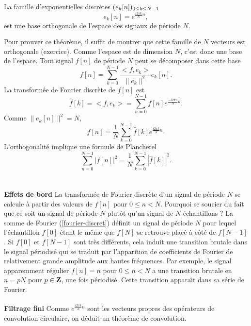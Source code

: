 \begin{theorem}
La famille d'exponentielles discr\`etes
$(e_k[n])_{ 0 \leq k \leq N-1}$
\begin{equation}
e_k[n] = e^{ \frac {i2 \pi k} N n  },
\end{equation}
est une base orthogonale de l'espace des signaux
de p\'eriode $N$.
\end{theorem}

Pour prouver ce th\'eor\`eme, il suffit de montrer que
cette famille de $N$ vecteurs est orthogonale (exercice).
Comme l'espace est
de dimension $N$, c'est donc une base de l'espace.
Tout signal $f[n]$ de p\'eriode $N$ peut se d\'ecomposer
dans cette base
\begin{equation}
f[n] =
\sum_{k=0} ^{N-1} \frac {<f,e_k>} {\|e_k \|^2}
e_k [n] .
\end{equation}
La transform\'ee de Fourier discr\`ete de $f[n]$ est
\begin{equation}
\label{fourier-discret}
{\hat f [k]}  = <f,e_k> =
\sum_{n=0} ^{N-1} f[n] e^{\frac {-i2 \pi n} N k  } .
\end{equation}
Comme $\| e_k [n] \|^2 = N$,
\begin{equation}
\label{fourier-discret-inverse}
f[n] =
\frac 1 N \sum_{k=0} ^{N-1} \hat f [k] e^{ \frac {i2 \pi k} N n  } .
\end{equation}
L'orthogonalit\'e implique une formule de Plancherel
\begin{equation}
\label{planch-discret}
\sum_{n=0} ^{N-1} |f[n]|^2 = \frac 1 N
\sum_{k=0} ^{N-1} |\hat f[k]|^2 .
\end{equation}
\\
\\
{\bf Effets de bord}
La transform\'ee de Fourier discr\`ete
d'un signal de p\'eriode $N$ se calcule \`a partir des
valeurs de $f[n]$ pour $0 \leq n < N$. Pourquoi se soucier
du fait que ce soit un signal de p\'eriode $N$ plut\^ot qu'un signal
de $N$ \'echantillons ?
La somme de Fourier (\ref{fourier-discret})
d\'efinit un signal de p\'eriode $N$ pour lequel l'\'echantillon
$f[0]$ \'etant le m\^eme que $f[N]$ se retrouve
plac\'e \`a c\^ot\'e de $f[N-1]$.
Si $f[0]$ et $f[N-1]$ sont tr\`es diff\'erents, cela induit une
transition brutale dans le signal p\'eriodis\'e qui se traduit
par l'apparition de coefficients de Fourier de relativement
grande amplitude aux hautes fr\'equences.
Par exemple, le signal apparemment r\'egulier
$f[n] = n$ pour $0 \leq n < N$
a une transition brutale en $n=pN$ pour $p \in {\bf{Z}}$,
une fois p\'eriodis\'e. Cette transition appara\^{\i}t
dans sa s\'erie de Fourier.
\\
\\
{\bf Filtrage fini}
Comme $e^{ \frac {i2 \pi k} N n  }$ sont les
vecteurs propres des op\'erateurs de convolution
circulaire, on d\'eduit un th\'eor\`eme de convolution.

